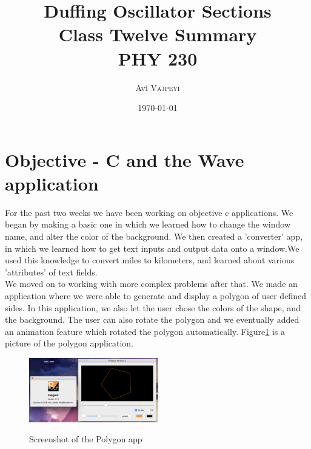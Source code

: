 \documentclass{article}
\title{Duffing Oscillator Sections\\ Class Twelve Summary\\ PHY 230} %
\author{Avi \textsc{Vajpeyi}} %
\date{\today} %
\begin{document}
\maketitle %





\section{Objective - C and the Wave application}

For the past two weeks we have been working on objective c applications. We began by making a basic one in which we learned how to change the window name, and alter the color of the background. We then created a 'converter' app, in which we learned how to get text inputs and output data onto a window.We used this knowledge to convert miles to kilometers, and learned about various 'attributes' of text fields.\\

We moved on to working with more complex problems after that. We made an application where we were able to generate and display a polygon of user defined sides. In this application, we also let the user chose the colors of the shape, and the background. The user can also rotate the polygon and we eventually added an animation feature which rotated the polygon automatically. Figure\ref{poly} is a picture of the polygon application.\\


\begin{figure}[h]
	\caption{Screenshot of the Polygon app}
	\centering
	\includegraphics[width=0.5\textwidth]{poly} \label{poly}
\end{figure}
\end{document}
